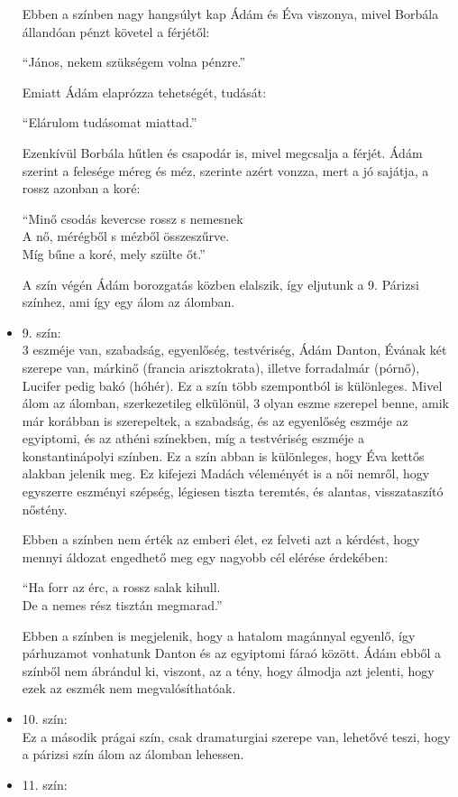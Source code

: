 \documentclass[]{article}
\begin{document}
\begin{itemize}
 			Ebben a színben nagy hangsúlyt kap Ádám és Éva viszonya, mivel Borbála állandóan pénzt követel a férjétől:
 			\begin{displayquote}
 				\enquote{János, nekem szükségem volna pénzre.}
 			\end{displayquote}
 			Emiatt Ádám elaprózza tehetségét, tudását:
 			\begin{displayquote}
 				\enquote{Elárulom tudásomat miattad.}
 			\end{displayquote}
 			Ezenkívül Borbála hűtlen és csapodár is, mivel megcsalja a férjét. Ádám szerint a felesége méreg és méz, szerinte azért vonzza, mert a jó sajátja, a rossz azonban a koré:
 			\begin{displayquote}
 				\enquote{Minő csodás kevercse rossz s nemesnek\\
 				A nő, mérégből s mézből összeszűrve.\\
 				Míg bűne a koré, mely szülte őt.}
 			\end{displayquote}
 			A szín végén Ádám borozgatás közben elalszik, így eljutunk a 9. Párizsi színhez, ami így egy álom az álomban.
		\item 9. szín:\\
			3 eszméje van, szabadság, egyenlőség, testvériség, Ádám Danton, Évának két szerepe van, márkinő (francia arisztokrata), illetve forradalmár (pórnő), Lucifer pedig bakó (hóhér). Ez a szín több szempontból is különleges. Mivel álom az álomban, szerkezetileg elkülönül, 3 olyan eszme szerepel benne, amik már korábban is szerepeltek, a szabadság, és az egyenlőség eszméje az egyiptomi, és az athéni színekben, míg a testvériség eszméje a konstantinápolyi színben. Ez a szín abban is különleges, hogy Éva kettős alakban jelenik meg. Ez kifejezi Madách véleményét is a női nemről, hogy egyszerre eszményi szépség, légiesen tiszta teremtés, és alantas, visszataszító nőstény.
			
			Ebben a színben nem érték az emberi élet, ez felveti azt a kérdést, hogy mennyi áldozat engedhető meg egy nagyobb cél elérése érdekében:
			\begin{displayquote}
				\enquote{Ha forr az érc, a rossz salak kihull.\\
				De a nemes rész tisztán megmarad.}
			\end{displayquote}
			Ebben a színben is megjelenik, hogy a hatalom magánnyal egyenlő, így párhuzamot vonhatunk Danton és az egyiptomi fáraó között. Ádám ebből a színből nem ábrándul ki, viszont, az a tény, hogy álmodja azt jelenti, hogy ezek az eszmék nem megvalósíthatóak.
		\item 10. szín:\\
			Ez a második prágai szín, csak dramaturgiai szerepe van, lehetővé teszi, hogy a párizsi szín álom az álomban lehessen.
		\item 11. szín:\\
			
	\end{itemize} 
\end{document}
